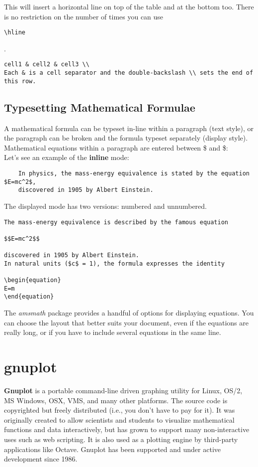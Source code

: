 This will insert a horizontal line on top of the table and at the bottom too. There is no restriction on the number of times you can use \begin{verbatim}
\hline
\end{verbatim}
. 
\begin{verbatim}
cell1 & cell2 & cell3 \\
Each & is a cell separator and the double-backslash \\ sets the end of this row. 
\end{verbatim}
\subsection{Typesetting Mathematical Formulae}
A mathematical formula can be typeset in-line within a paragraph (text style),
or the paragraph can be broken and the formula typeset separately (display
style). Mathematical equations within a paragraph are entered between \$
and \$:\\

Let's see an example of the \textbf{inline} mode: 

\begin{verbatim}
	In physics, the mass-energy equivalence is stated by the equation $E=mc^2$,
	discovered in 1905 by Albert Einstein.
\end{verbatim}

The displayed mode has two versions: numbered and unnumbered.\\
\begin{verbatim}
The mass-energy equivalence is described by the famous equation

$$E=mc^2$$

discovered in 1905 by Albert Einstein. 
In natural units ($c$ = 1), the formula expresses the identity

\begin{equation}
E=m
\end{equation}
\end{verbatim}


The \textit{amsmath} package provides a handful of options for displaying equations. You can choose the layout that better suits your document, even if the equations are really long, or if you have to include several equations in the same line.

\section{gnuplot}
		\textbf{Gnuplot} is a portable command-line driven graphing utility for Linux, OS/2, MS Windows, OSX, VMS, and many other platforms. The source code is copyrighted but freely distributed (i.e., you don't have to pay for it). It was originally created to allow scientists and students to visualize mathematical functions and data interactively, but has grown to support many non-interactive uses such as web scripting. It is also used as a plotting engine by third-party applications like Octave. Gnuplot has been supported and under active development since 1986. \\
		
